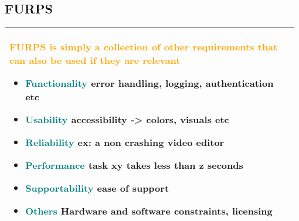 \documentclass[main.tex,fontsize=8pt,paper=a4,paper=portrait,DIV=calc,]{scrartcl}
\begin{document}
\begin{table}[ht!]
\subsection{FURPS}
\begin{tabular}{|m{0.977\linewidth}|}
\hline
\textcolor{orange}{FURPS is simply a collection of other requirements that can also be used if they are relevant}\newline
\begin{itemize}
  \item \textcolor{teal}{Functionality} error handling, logging, authentication etc
  \item \textcolor{teal}{Usability} accessibility -> colors, visuals etc
  \item \textcolor{teal}{Reliability} ex: a non crashing video editor
  \item \textcolor{teal}{Performance} task xy takes less than z seconds
  \item \textcolor{teal}{Supportability} ease of support
  \item \textcolor{teal}{Others} Hardware and software constraints, licensing
  \vspace{-3mm}
\end{itemize} \\ 
\hline
\end{tabular}
\end{table}
\pagebreak
\end{document}

